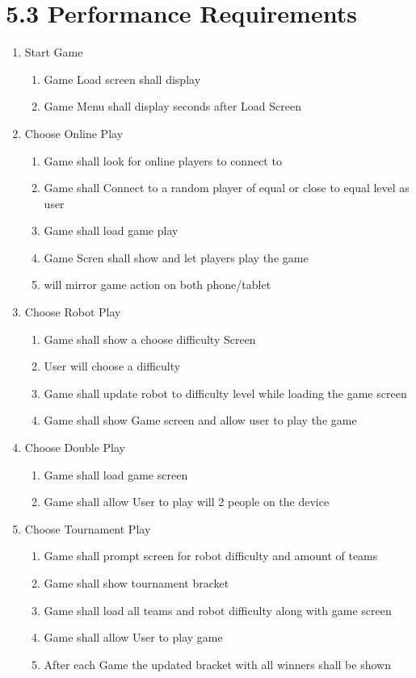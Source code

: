 \documentclass{article}
\begin{document}
\section{5.3 Performance Requirements}
\begin{enumerate}
\item Start Game
	\begin{enumerate}
	\item Game Load screen shall display
	\item Game Menu shall display seconds after Load Screen
	\end{enumerate}
\item Choose Online Play
	\begin{enumerate}
	\item Game shall look for online players to connect to
	\item Game shall Connect to a random player of equal or close to equal level as user
	\item Game shall load game play
	\item Game Scren shall show and let players play the game
	\item will mirror game action on both phone/tablet
	\end{enumerate}
\item  Choose Robot Play
	\begin{enumerate}
	\item Game shall show a choose difficulty Screen
	\item User will choose a difficulty
	\item Game shall update robot to difficulty level while loading the game screen
	\item Game shall show Game screen and allow user to play the game
	\end{enumerate}
\item Choose Double Play
	\begin{enumerate}
	\item Game shall load game screen
	\item Game shall allow User to play will 2 people on the device
	\end{enumerate}
\item Choose Tournament Play
	\begin{enumerate}
	\item Game shall prompt screen for robot difficulty and amount of teams
	\item Game shall show tournament bracket
	\item Game shall load all teams and robot difficulty along with game screen
	\item Game shall allow User to play game
	\item After each Game the updated bracket with all winners shall be shown
	\end{enumerate}
\end{enumerate} 
\end{document}
